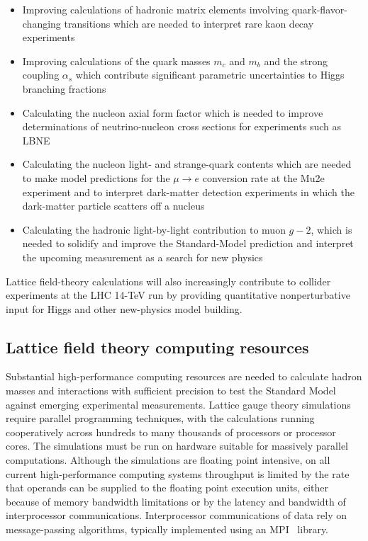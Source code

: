 \begin{itemize}

\item Improving calculations of hadronic matrix elements involving
quark-flavor-changing transitions which are needed to interpret rare kaon
decay experiments

\item Improving calculations of the quark masses $m_c$ and $m_b$ and the
strong coupling $\alpha_s$ which contribute significant parametric
uncertainties to Higgs branching fractions

\item Calculating the nucleon axial form factor which is needed to improve
determinations of neutrino-nucleon cross sections for experiments such as
LBNE

\item Calculating the nucleon light- and strange-quark contents which are
needed to make model predictions for the $\mu \to e$ conversion rate at the
Mu2e experiment and to interpret dark-matter detection experiments in
which the dark-matter particle scatters off a nucleus

\item Calculating the hadronic light-by-light contribution to muon $g-2$, which
is needed to solidify and improve the Standard-Model prediction and interpret
the upcoming measurement as a search for new physics

\end{itemize}

Lattice field-theory calculations will also increasingly contribute to
collider experiments at the LHC 14-TeV run by providing quantitative
nonperturbative input for Higgs and other new-physics model building.

\subsection{Lattice field theory computing resources}

Substantial high-performance computing resources are needed to calculate
hadron masses and interactions with sufficient precision to test the Standard
Model against emerging experimental measurements.  Lattice gauge theory
simulations require parallel programming techniques, with the calculations
running cooperatively across hundreds to many thousands of processors or
processor cores.  The simulations must be run on hardware suitable for
massively parallel computations.  Although the simulations are
floating point intensive, on all current high-performance computing systems
throughput is limited by the rate that operands can be supplied to the
floating point execution units, either because of memory bandwidth limitations
or by the latency and bandwidth of interprocessor communications.
Interprocessor communications of data rely on message-passing
algorithms, typically implemented using an MPI~\cite{MPI} library.

